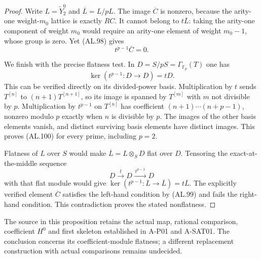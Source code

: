 \begin{proof}
Write $L=\widetilde Y_2^0$ and
$\overline L=L/pL$. The image $\overline C$ is
nonzero, because the arity-one weight-$m_0$ lattice
is exactly $RC$. It cannot belong to
$t\overline L$: taking the arity-one component
of weight $m_0$ would require an arity-one element
of weight $m_0-1$, whose group is zero. Yet (AL.98)
gives
\[
             t^{p-1}\overline C=0.
 \tag{AL.99}
\]

We finish with the precise flatness test. In
$D=S/pS=\Gamma_{\mathbb F_p}(T)$ one has
\[
             \ker(t^{p-1}:D\to D)=tD.
 \tag{AL.100}
\]
This can be verified directly on its divided-power
basis. Multiplication by $t$ sends $T^{[n]}$ to
$(n+1)T^{[n+1]}$, so its image is spanned by
$T^{[m]}$ with $m$ not divisible by $p$.
Multiplication by $t^{p-1}$ on $T^{[n]}$ has
coefficient $(n+1)\cdots(n+p-1)$, nonzero modulo
$p$ exactly when $n$ is divisible by $p$.
The images of the other basis elements vanish,
and distinct surviving basis elements have
distinct images. This proves (AL.100) for every
prime, including $p=2$.

Flatness of $L$ over $S$ would make
$\overline L=L\otimes_S D$ flat over $D$.
Tensoring the exact-at-the-middle sequence
\[
 D\xrightarrow{\ t\ }D
       \xrightarrow{\ t^{p-1}\ }D
 \tag{AL.101}
\]
with that flat module would give
$\ker(t^{p-1}:\overline L\to\overline L)
=t\overline L$. The explicitly verified element
$\overline C$ satisfies the left-hand condition
by (AL.99) and fails the right-hand condition.
This contradiction proves the stated nonflatness.
\end{proof}

The source in this proposition retains the actual
map, rational comparison, coefficient $H^0$ and
first skeleton established in A-P01 and A-SAT01.
The conclusion concerns its coefficient-module
flatness; a different replacement construction
with actual comparisons remains undecided.
